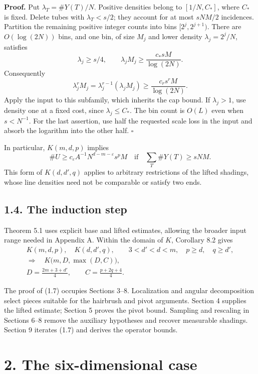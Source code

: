 \documentclass[
  11pt,
  a4paper,
]{article}
\begin{document}
\textbf{Proof.} Put \(\lambda_T=\#Y(T)/N\). Positive densities belong to
\([1/N,C_*]\), where \(C_*\) is fixed. Delete tubes with
\(\lambda_T<s/2\); they account for at most \(sNM/2\) incidences.
Partition the remaining positive integer counts into bins
\([2^j,2^{j+1})\). There are \(O(\log(2N))\) bins, and one bin, of size
\(M_j\) and lower density \(\lambda_j=2^j/N\), satisfies \[
 \lambda_j\ge s/4,
 \qquad \lambda_jM_j\ge\frac{c_*sM}{\log(2N)}.
\] Consequently \[
 \lambda_j^rM_j
 =\lambda_j^{r-1}(\lambda_jM_j)
 \ge\frac{c_rs^rM}{\log(2N)}.
\] Apply the input to this subfamily, which inherits the cap bound. If
\(\lambda_j>1\), use density one at a fixed cost, since
\(\lambda_j\le C_*\). The bin count is \(O(L)\) even when \(s<N^{-1}\).
For the last assertion, use half the requested scale loss in the input
and absorb the logarithm into the other half. \(\square\)

In particular, \(K(m,d,p)\) implies \[
 \#U\ge c_\varepsilon A^{-1}N^{d-m-\varepsilon}s^pM
 \quad\text{if}\quad \sum_T\#Y(T)\ge sNM.
\] This form of \(K(d,d',q)\) applies to arbitrary restrictions of the
lifted shadings, whose line densities need not be comparable or satisfy
two ends.

\hypertarget{the-induction-step}{%
\subsection{1.4. The induction step}\label{the-induction-step}}

Theorem 5.1 uses explicit base and lifted estimates, allowing the
broader input range needed in Appendix A. Within the domain of \(K\),
Corollary 8.2 gives \[
 \begin{gathered}
 K(m,d,p),\quad K(d,d',q),\qquad
 3<d'<d<m,\quad p\ge d,\quad q\ge d',\\
 \Longrightarrow\quad K\bigl(m,D,\max(D,C)\bigr),\\
 D=\frac{2m+3+d'}4,
 \qquad C=\frac{p+2q+4}4.                           \tag{1.7}\label{eq:1.7}
 \end{gathered}
\]

The proof of (1.7) occupies Sections 3--8. Localization and angular
decomposition select pieces suitable for the hairbrush and pivot
arguments. Section 4 supplies the lifted estimate; Section 5 proves the
pivot bound. Sampling and rescaling in Sections 6--8 remove the
auxiliary hypotheses and recover measurable shadings. Section 9 iterates
(1.7) and derives the operator bounds.

\hypertarget{the-six-dimensional-case}{%
\section{2. The six-dimensional case}\label{the-six-dimensional-case}}
\end{document}
